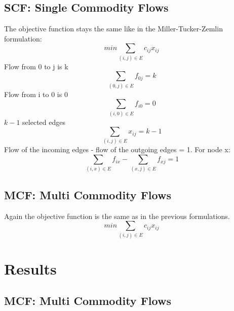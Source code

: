 \documentclass{article}
\begin{document}
\subsection{SCF: Single Commodity Flows \label{scf}}
The objective function stays the same like in the Miller-Tucker-Zemlin formulation:
\begin{equation}
min \sum_{(i,j) \in E} c_{ij} x_{ij}
\end{equation}
Flow from 0 to j is k
\begin{equation}
\sum_{(0,j) \in E} f_{0j} = k
\end{equation}
Flow from i to 0 is 0
\begin{equation}
\sum_{(i,0) \in E} f_{i0} = 0
\end{equation}
$k-1$ selected edges
\begin{equation}
\sum_{(i,j) \in E} x_{ij} = k - 1
\end{equation}
Flow of the incoming edges - flow of the outgoing edges = 1. For node x: 
\begin{equation}
\sum_{(i,x) \in E} f_{ix} - \sum_{(x,j) \in E} f_{xj} = 1
\end{equation}



\subsection{MCF: Multi Commodity Flows \label{mcf}}
Again the objective function is the same as in the previous formulations.
\begin{equation}
min \sum_{(i,j) \in E} c_{ij} x_{ij}
\end{equation}

\section{Results}

\subsection{MCF: Multi Commodity Flows \label{mcf}}
\end{document}
